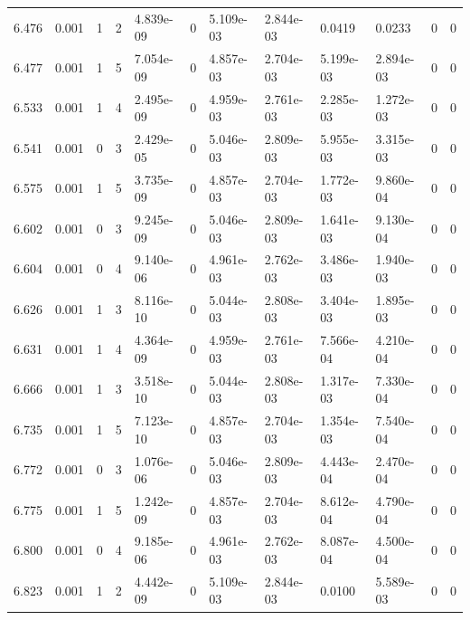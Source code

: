 \documentclass[preview]{standalone}
\begin{document}
{{{{{{{{\begin{tabular}{L{1.2cm}C{1.2cm} C{0.3cm}C{0.5cm} C{1.4cm}C{1.4cm} C{1.4cm}C{1.4cm} C{1.6cm}C{1.6cm} C{1.6cm}C{1.6cm}}
  6.476  &  0.001  & 1     &  2 &  4.839e-09  & 0  &  5.109e-03&   2.844e-03& 0.0419 & 0.0233   &  0 & 0  \\ 
  6.477  &  0.001  & 1     &  5 &  7.054e-09  & 0  &  4.857e-03&   2.704e-03& 5.199e-03 & 2.894e-03   &  0 & 0  \\ 
  6.533  &  0.001  & 1     &  4 &  2.495e-09  & 0  &  4.959e-03&   2.761e-03& 2.285e-03 & 1.272e-03   &  0 & 0  \\ 
  6.541  &  0.001  & 0     &  3 &  2.429e-05  & 0  &  5.046e-03&   2.809e-03& 5.955e-03 & 3.315e-03   &  0 & 0  \\ 
  6.575  &  0.001  & 1     &  5 &  3.735e-09  & 0  &  4.857e-03&   2.704e-03& 1.772e-03 & 9.860e-04   &  0 & 0  \\ 
  6.602  &  0.001  & 0     &  3 &  9.245e-09  & 0  &  5.046e-03&   2.809e-03& 1.641e-03 & 9.130e-04   &  0 & 0  \\ 
  6.604  &  0.001  & 0     &  4 &  9.140e-06  & 0  &  4.961e-03&   2.762e-03& 3.486e-03 & 1.940e-03   &  0 & 0  \\ 
  6.626  &  0.001  & 1     &  3 &  8.116e-10  & 0  &  5.044e-03&   2.808e-03& 3.404e-03 & 1.895e-03   &  0 & 0  \\ 
  6.631  &  0.001  & 1     &  4 &  4.364e-09  & 0  &  4.959e-03&   2.761e-03& 7.566e-04 & 4.210e-04   &  0 & 0  \\ 
  6.666  &  0.001  & 1     &  3 &  3.518e-10  & 0  &  5.044e-03&   2.808e-03& 1.317e-03 & 7.330e-04   &  0 & 0  \\ 
  6.735  &  0.001  & 1     &  5 &  7.123e-10  & 0  &  4.857e-03&   2.704e-03& 1.354e-03 & 7.540e-04   &  0 & 0  \\ 
  6.772  &  0.001  & 0     &  3 &  1.076e-06  & 0  &  5.046e-03&   2.809e-03& 4.443e-04 & 2.470e-04   &  0 & 0  \\ 
  6.775  &  0.001  & 1     &  5 &  1.242e-09  & 0  &  4.857e-03&   2.704e-03& 8.612e-04 & 4.790e-04   &  0 & 0  \\ 
  6.800  &  0.001  & 0     &  4 &  9.185e-06  & 0  &  4.961e-03&   2.762e-03& 8.087e-04 & 4.500e-04   &  0 & 0  \\ 
  6.823  &  0.001  & 1     &  2 &  4.442e-09  & 0  &  5.109e-03&   2.844e-03& 0.0100 & 5.589e-03   &  0 & 0  \\ 
\hline 
\end{tabular} 

}}}}}}}}
\end{document}
